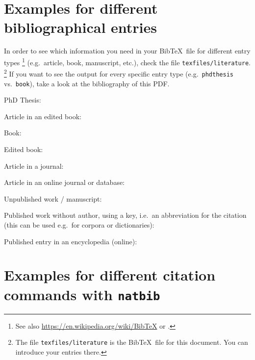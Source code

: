 \section{Examples for different bibliographical entries}
\label{ch:BibEntries}


In order to see which information you need in your Bib\TeX\ file for different entry types%
	\footnote{See also \url{https://en.wikipedia.org/wiki/BibTeX} or \citet{Freitag&MyP15a}.} %
(e.g.\ article, book, manuscript, etc.), check the file \texttt{texfiles/literature}.%
	\footnote{The file \texttt{texfiles/literature} is the Bib\TeX\ file for this document. You can introduce your entries there.} %
If you want to see the output for every specific entry type (e.g.\ \texttt{phdthesis} vs.\ \texttt{book}), take a look at the bibliography of this PDF.


\begin{itemize*}
	\item PhD Thesis: \citet{Abney87a}
	
	\item Article in an edited book: \citet{Ackema15a}
	
	\item Book: \citet{Adger04a}
	
	\item Edited book: \citet{Nolda&Co14a}
	
	\item Article in a journal: \citet{Barwise&Co81a}
	
	\item Article in an online journal or database:
	\citet{Kolb&Co10a}
	
	\item Unpublished work / manuscript: \citet{MyP17c}
	
	\item Published work without author, using a key, i.e.\ an abbreviation for the citation (this can be used e.g.\ for corpora or dictionaries): \citep{DR17a}
	
	\item Published entry in an encyclopedia (online): \citet{MyP18b}
\end{itemize*}


\section{Examples for different citation commands with \texttt{natbib}}
\label{ch:CitationCommands}

